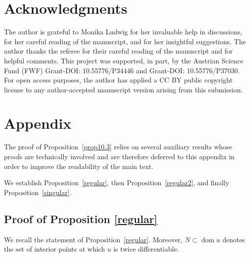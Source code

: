 \documentclass[11pt]{article}
\theoremstyle{definition} %
\DeclareMathOperator{\dom}{dom}
\begin{document}
\section*{Acknowledgments}
The author is grateful to Monika Ludwig for her invaluable help in discussions, for her careful reading of the manuscript, and for her insightful suggestions. The author thanks the referee for their careful reading of the manuscript and for helpful comments. This project was supported, in part, by the Austrian Science Fund (FWF) Grant-DOI: 10.55776/P34446 and Grant-DOI: 10.55776/P37030. For open access purposes, the author has applied a CC BY public copyright license to any author-accepted manuscript version arising from this submission.










\newpage

\appendix

\section{Appendix}\label{apendice}


The proof of Proposition~\ref{prop10.3} relies on several auxiliary results whose proofs are technically involved and are therefore deferred to this appendix in order to improve the readability of the main text.

We establish Proposition~\ref{regular}, then Proposition~\ref{regular2}, and finally Proposition~\ref{singular}.




\subsection{Proof of Proposition \ref{regular}}

We recall the statement of Proposition~\ref{regular}. Moreover, $N \subset \dom u$ denotes the set of interior points at which $u$ is twice differentiable.
\end{document}
